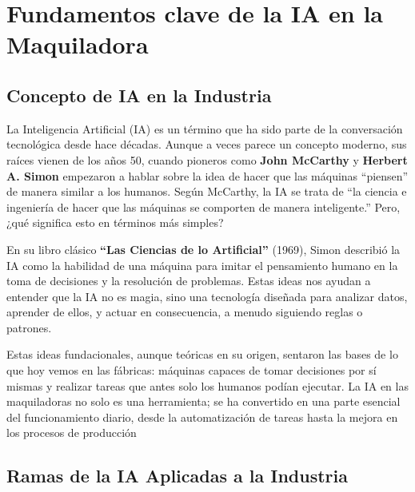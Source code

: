 \documentclass[
  10pt,
  letterpaper,
]{book}
\begin{document}

\chapter{Fundamentos clave de la IA en la
Maquiladora}\label{fundamentos-clave-de-la-ia-en-la-maquiladora}

\section{Concepto de IA en la
Industria}\label{concepto-de-ia-en-la-industria}

La Inteligencia Artificial (IA) es un término que ha sido parte de la
conversación tecnológica desde hace décadas. Aunque a veces parece un
concepto moderno, sus raíces vienen de los años 50, cuando pioneros como
\textbf{John McCarthy} y \textbf{Herbert A. Simon} empezaron a hablar
sobre la idea de hacer que las máquinas ``piensen'' de manera similar a
los humanos. Según McCarthy, la IA se trata de ``la ciencia e ingeniería
de hacer que las máquinas se comporten de manera inteligente.'' Pero,
¿qué significa esto en términos más simples?

En su libro clásico \textbf{``Las Ciencias de lo Artificial''} (1969),
Simon describió la IA como la habilidad de una máquina para imitar el
pensamiento humano en la toma de decisiones y la resolución de
problemas. Estas ideas nos ayudan a entender que la IA no es magia, sino
una tecnología diseñada para analizar datos, aprender de ellos, y actuar
en consecuencia, a menudo siguiendo reglas o patrones.

Estas ideas fundacionales, aunque teóricas en su origen, sentaron las
bases de lo que hoy vemos en las fábricas: máquinas capaces de tomar
decisiones por sí mismas y realizar tareas que antes solo los humanos
podían ejecutar. La IA en las maquiladoras no solo es una herramienta;
se ha convertido en una parte esencial del funcionamiento diario, desde
la automatización de tareas hasta la mejora en los procesos de
producción

\section{Ramas de la IA Aplicadas a la
Industria}\label{ramas-de-la-ia-aplicadas-a-la-industria}
\end{document}

